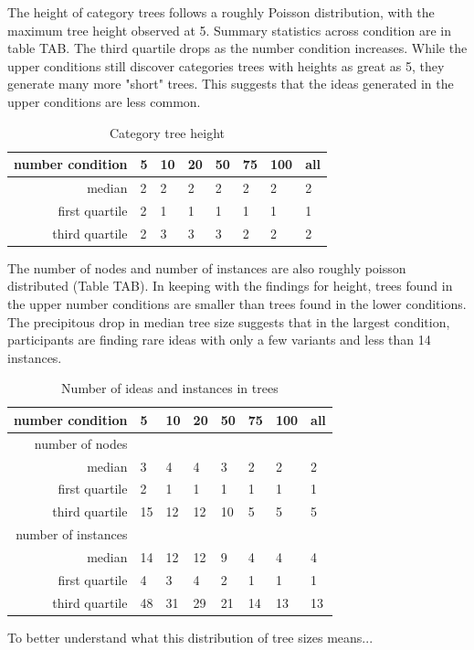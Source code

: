 The height of category trees follows a roughly Poisson distribution, with the maximum tree height observed at 5. Summary statistics across condition are in table TAB. The third quartile drops as the number condition increases. While the upper conditions still discover categories trees with heights as great as 5, they generate many more "short" trees. This suggests that the ideas generated in the upper conditions are less common.

\begin{table}
	\begin{tabular}[h!]{r | l l l l l l l}
	\textbf{number condition} & 5 & 10 & 20 & 50 & 75 & 100 & all \\ \hline \hline
	median & 2 & 2 & 2 & 2 & 2 & 2 & 2\\
	first quartile & 2 & 1  & 1 & 1 & 1 & 1 & 1\\
	third quartile & 2 & 3 &3 &3 &2 &2 & 2\\
	\end{tabular}
	\caption{Category tree height}
\end{table}

The number of nodes and number of instances are also roughly poisson distributed (Table TAB). In keeping with the findings for height, trees found in the upper number conditions are smaller than trees found in the lower conditions. The precipitous drop in median tree size suggests that in the largest condition, participants are finding rare ideas with only a few variants and less than 14 instances.

\begin{table}
\begin{tabular}[h!]{r | l l l l l l l}
	\textbf{number condition} & 5 & 10 & 20 & 50 & 75 & 100 & all \\ \hline \hline
	number of nodes& \\ \hline
	median &3&4&4&3&2&2&2 \\
	first quartile &2&1&1&1&1&1&1 \\
	third quartile &15&12&12&10&5&5&5 \\
	number of instances& \\ \hline
	median &14&12&12&9&4&4&4 \\
	first quartile &4&3&4&2&1&1&1 \\
	third quartile &48&31&29&21&14&13&13 \\
	\end{tabular}
	\caption{Number of ideas and instances in trees}
\end{table}

To better understand what this distribution of tree sizes means...